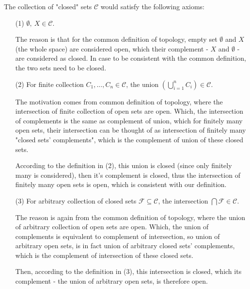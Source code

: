 \documentclass{article}
\begin{document}
The collection of "closed" sets $\mathcal{C}$ would satisfy the following axioms:
\begin{itemize}
    \item[(1)] $\emptyset,\ X\in \mathcal{C}$. 
    
    The reason is that for the common definition of topology, 
    empty set $\emptyset$ and $X$ (the whole space) are considered open, which their complement - $X$ and $\emptyset$ -
    are considered as closed. In case to be consistent with the common definition, the two sets need to be closed.

    \hfill

    \item[(2)] For finite collection $C_1,...,C_n \in \mathcal{C}$, the union $\left(\bigcup_{i=1}^{n}C_i\right)\in \mathcal{C}$.
    
    The motivation comes from common definition of topology, where the intersection of finite collection of open sets are open.
    Which, the intersection of complements is the same as complement of union, which for finitely many open sets,
    their intersection can be thought of as intersection of finitely many "closed sets' complements", which is the complement of union of these closed sets.
    
    According to the definition in (2), this union is closed (since only finitely many is considered), then it's complement is closed,
    thus the intersection of finitely many open sets is open, which is consistent with our definition.

    \hfill

    \item[(3)] For arbitrary collection of closed sets $\mathcal{F}\subseteq \mathcal{C}$, the intersection $\bigcap \mathcal{F}\in \mathcal{C}$.
    
    The reason is again from the common definition of topology, where the union of arbitrary collection of open sets are open.
    Which, the union of complements is equivalent to complement of intersection, so union of arbitrary open sets,
    is in fact union of arbitrary closed sets' complements, which is the complement of intersection of these closed sets.

    Then, according to the definition in (3), this intersection is closed, which its complement - the union of arbitrary open sets, is therefore open.
    
\end{itemize}

\break
\end{document}
